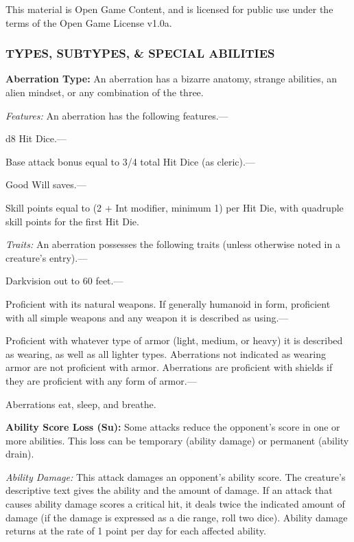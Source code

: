 \documentclass{article}
\begin{document}
This material is Open Game Content, and is licensed for public use under the terms 
of the Open Game License v1.0a.

\subsubsection*{{\LARGE{}TYPES, SUBTYPES, \& SPECIAL ABILITIES}}

\vspace{12pt}
\textbf{Aberration Type:} An aberration has a bizarre anatomy, strange abilities, 
an alien mindset, or any combination of the three.

\textit{Features: }An aberration has the following features.---

d8 Hit Dice.---

Base attack bonus equal to 3/4 total Hit Dice (as cleric).---

Good Will saves.---

Skill points equal to (2 + Int modifier, minimum 1) per Hit Die, with quadruple 
skill points for the first Hit Die.

\textit{Traits: }An aberration possesses the following traits (unless otherwise 
noted in a creature's entry).---

Darkvision out to 60 feet.---

Proficient with its natural weapons. If generally humanoid in form, proficient 
with all simple weapons and any weapon it is described as using.---

Proficient with whatever type of armor (light, medium, or heavy) it is described 
as wearing, as well as all lighter types. Aberrations not indicated as wearing 
armor are not proficient with armor. Aberrations are proficient with shields if 
they are proficient with any form of armor.---

Aberrations eat, sleep, and breathe.

\vspace{12pt}
\textbf{Ability Score Loss (Su):} Some attacks reduce the opponent's score in one 
or more abilities. This loss can be temporary (ability damage) or permanent (ability 
drain).

\textit{Ability Damage: }This attack damages an opponent's ability score. The creature's 
descriptive text gives the ability and the amount of damage. If an attack that 
causes ability damage scores a critical hit, it deals twice the indicated amount 
of damage (if the damage is expressed as a die range, roll two dice). Ability damage 
returns at the rate of 1 point per day for each affected ability.
\end{document}

